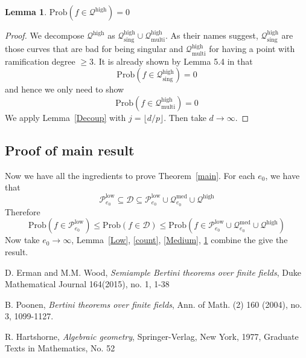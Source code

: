 \documentclass[12pt]{article}
\theoremstyle{plain}
\newtheorem{lemma}[equation]{Lemma}
\theoremstyle{definition}
\newcommand{\sD}{\mathcal{D}}
\newcommand{\sP}{\mathcal{P}}
\newcommand{\sQ}{\mathcal{Q}}
\newcommand{\<}{\langle}
\renewcommand{\>}{\rangle}
\newcommand{\Prob}{\mathrm{Prob}}
\begin{document}
\begin{lemma}
\label{High}
$\Prob( f\in \sQ^{\mathrm{high}}) = 0$
\end{lemma}
\begin{proof}
We decompose $\sQ^{\mathrm{high}}$ as $\sQ^{\mathrm{high}}_{\mathrm{sing}} \cup \sQ^{\mathrm{high}}_{\mathrm{multi}}$. As their names suggest, $\sQ^{\mathrm{high}}_{\mathrm{sing}}$ are those curves that are bad for being singular and $\sQ^{\mathrm{high}}_{\mathrm{multi}}$ for having a point with ramification degree $\ge 3$. 
It is already shown by Lemma 5.4 in \cite{Wood} that $$ \Prob(f \in \sQ^{\mathrm{high}}_{\mathrm{sing}}) = 0 $$ and hence we only need to show
$$ \Prob(f \in \sQ^{\mathrm{high}}_{\mathrm{multi}}) = 0 $$
We apply Lemma~\ref{Decoup} with $j = \lfloor d/p \rfloor$. Then take $d \to \infty$.  
\end{proof}

\subsection{Proof of main result}
Now we have all the ingredients to prove Theorem~\ref{main}. For each $e_0$, we have that 
$$  \sP_{e_0}^{\mathrm{low}} \subseteq \sD \subseteq \sP_{e_0}^{\mathrm{low}} \cup \sQ_{e_0}^{\mathrm{med}} \cup \sQ^{\mathrm{high}}$$
Therefore 
$$ \Prob(f \in \sP_{e_0}^{\mathrm{low}}) \le \Prob(f \in \sD) \le \Prob(f \in \sP_{e_0}^{\mathrm{low}} \cup \sQ_{e_0}^{\mathrm{med}} \cup \sQ^{\mathrm{high}})$$
Now take $e_0 \to \infty$, Lemma~\ref{Low}, \ref{count}, \ref{Medium}, \ref{High} combine the give the result. 

\begin{thebibliography}{9} 
D. Erman and M.M. Wood, \textit{Semiample Bertini theorems over finite fields}, Duke Mathematical Journal 164(2015), no. 1, 1-38

B. Poonen, \textit{Bertini theorems over finite fields}, Ann. of Math. (2) 160 (2004), no. 3, 1099-1127.


R. Hartshorne, \textit{Algebraic geometry}, Springer-Verlag, New York, 1977, Graduate Texts in Mathematics, No. 52

\end{thebibliography}
\end{document}

